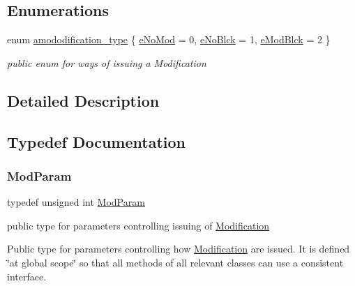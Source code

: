 \subsection*{Enumerations}
\begin{DoxyCompactItemize}
\item 
enum \mbox{\hyperlink{group___modification___t_y_p_e_s_ga48fddcdd03a03f49b7e389ca1ed938d4}{amododification\+\_\+type}} \{ \mbox{\hyperlink{group___modification___t_y_p_e_s_gga48fddcdd03a03f49b7e389ca1ed938d4a57f092e099708d34d61bb2cf66f074b3}{e\+No\+Mod}} = 0, 
\mbox{\hyperlink{group___modification___t_y_p_e_s_gga48fddcdd03a03f49b7e389ca1ed938d4ada69e89c5f46e563d8a13cfa6830c136}{e\+No\+Blck}} = 1, 
\mbox{\hyperlink{group___modification___t_y_p_e_s_gga48fddcdd03a03f49b7e389ca1ed938d4a21b14b26b1c0093a0905f6fc010bad29}{e\+Mod\+Blck}} = 2
 \}
\begin{DoxyCompactList}\small\item\em public enum for ways of issuing a Modification \end{DoxyCompactList}\end{DoxyCompactItemize}


\subsection{Detailed Description}


\subsection{Typedef Documentation}
\mbox{\label{group___modification___t_y_p_e_s_gac8fdf1a69f314970b9aaa9328e3f3907}} 
\subsubsection{\texorpdfstring{Mod\+Param}{ModParam}}
{\footnotesize\ttfamily typedef unsigned int \mbox{\hyperlink{group___modification___t_y_p_e_s_gac8fdf1a69f314970b9aaa9328e3f3907}{Mod\+Param}}}



public type for parameters controlling issuing of \mbox{\hyperlink{class_s_m_spp__di__unipi__it_1_1_modification}{Modification}} 

Public type for parameters controlling how \mbox{\hyperlink{class_s_m_spp__di__unipi__it_1_1_modification}{Modification}} are issued. It is defined \char`\"{}at global scope\char`\"{} so that all methods of all relevant classes can use a consistent interface. 

